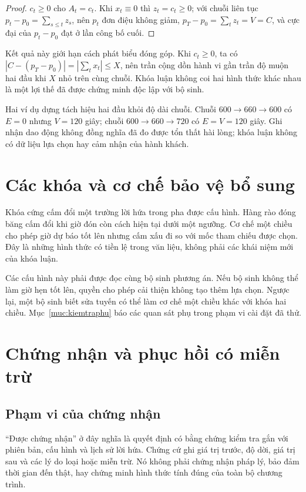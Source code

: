 \begin{proof}
$c_t \ge 0$ cho $A_t = c_t$. Khi $x_t \equiv 0$ thì $z_t = c_t \ge 0$; với chuỗi liên tục
$p_t - p_0 = \sum_{s \le t} z_s$, nên $p_t$ đơn điệu không giảm, $p_T - p_0 = \sum_t z_t = V = C$,
và cực đại của $p_t - p_0$ đạt ở lần công bố cuối.
\end{proof}

Kết quả này giới hạn cách phát biểu đóng góp. Khi $c_t\ge0$, ta có
$|C-(p_T-p_0)|=|\sum_t x_t|\le X$, nên trần cộng dồn hành vi gần trần độ muộn hai đầu
khi $X$ nhỏ trên cùng chuỗi. Khóa luận không coi hai hình thức khác nhau là một lợi thế
đã được chứng minh độc lập với bộ sinh.

Hai ví dụ dựng tách hiệu hai đầu khỏi độ dài chuỗi. Chuỗi $600\to660\to600$ có $E=0$ nhưng
$V=120$ giây; chuỗi $600\to660\to720$ có $E=V=120$ giây. Ghi nhận dao động không đồng nghĩa
đã đo được tổn thất hài lòng; khóa luận không có dữ liệu lựa chọn hay cảm nhận của hành khách.

\section{Các khóa và cơ chế bảo vệ bổ sung}

Khóa cứng cấm đổi một trường lời hứa trong pha được cấu hình. Hàng rào đóng băng cấm đổi khi
giờ đón còn cách hiện tại dưới một ngưỡng. Cơ chế một chiều cho phép giờ dự báo tốt lên nhưng
cấm xấu đi so với mốc tham chiếu được chọn. Đây là những hình thức có tiền lệ trong văn liệu,
không phải các khái niệm mới của khóa luận.

Các cấu hình này phải được đọc cùng bộ sinh phương án. Nếu bộ sinh không thể làm giờ hẹn
tốt lên, quyền cho phép cải thiện không tạo thêm lựa chọn. Ngược lại, một bộ sinh biết sửa
tuyến có thể làm cơ chế một chiều khác với khóa hai chiều. Mục~\ref{muc:kiemtraphu} báo các
quan sát phụ trong phạm vi cài đặt đã thử.

\section{Chứng nhận và phục hồi có miễn trừ}
\label{muc:phuchoi}

\subsection{Phạm vi của chứng nhận}

``Được chứng nhận'' ở đây nghĩa là quyết định có bằng chứng kiểm tra gắn với phiên bản,
cấu hình và lịch sử lời hứa. Chứng cứ ghi giá trị trước, độ dời, giá trị sau và các lý do
loại hoặc miễn trừ. Nó không phải chứng nhận pháp lý, bảo đảm thời gian đến thật, hay chứng
minh hình thức tính đúng của toàn bộ chương trình.

